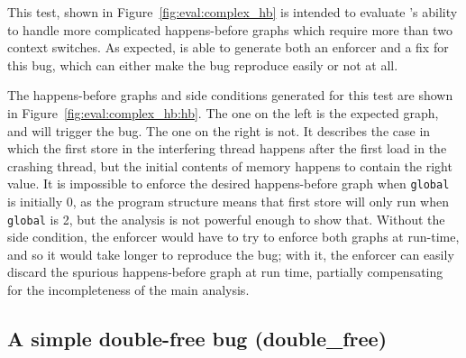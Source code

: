 This test, shown in Figure~\ref{fig:eval:complex_hb} is intended to
evaluate {\technique}'s ability to handle more complicated
happens-before graphs which require more than two context switches.
As expected, {\implementation} is able to generate both an enforcer
and a fix for this bug, which can either make the bug reproduce easily
or not at all.

The happens-before graphs and side conditions generated for this test
are shown in Figure~\ref{fig:eval:complex_hb:hb}.  The one on the left
is the expected graph, and will trigger the bug.  The one on the right
is not.  It describes the case in which the first store in the
interfering thread happens after the first load in the crashing
thread, but the initial contents of memory happens to contain the
right value.  It is impossible to enforce the desired happens-before
graph when \texttt{global} is initially 0, as the program structure
means that first store will only run when \texttt{global} is 2, but
the {\technique} analysis is not powerful enough to show that.
Without the side condition, the enforcer would have to try to enforce
both graphs at run-time, and so it would take longer to reproduce the
bug; with it, the enforcer can easily discard the spurious
happens-before graph at run time, partially compensating for the
incompleteness of the main analysis.

\subsection{A simple double-free bug (double\_free)}

